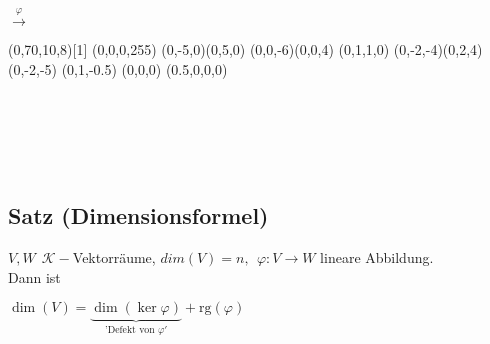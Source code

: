 \documentclass[a4paper, 12pt,titlepage, pdf, headsepline]{scrartcl}
\newcommand{\R}{\mathds{R}}
\newcommand{\K}{\mathcal{K}}
\newcommand{\rg}{\textrm{rg}}
\renewcommand{\>}{\rightarrow}
\renewcommand{\*}{\cdot}
\renewcommand{\phi}{\varphi}
\begin{document}
		      			\begin{minipage}[c]{0.15\textwidth}~\\
		      				~\\
		      				~\\
		      				~\\
		      				~\\
		      				~\\
		      				\centering	$\overset{\phi}{\longrightarrow}$
		      			\end{minipage}
		      			\begin{minipage}[c]{0.425\textwidth}
		      				\Viewpoint(0,70,10,8)[1]
		      				\SetCMYKColor(0,0,0,255)
		      				\SetNormal
		      				\DDArrowAt(0,-5,0)(0,5,0)
		      				\DDArrowAt(0,0,-6)(0,0,4)
		      				\Text[r]{$y~~~~~~~~~~~~~~~~~~~~~\R^2$}
		      				\SetCMYKColor(0,1,1,0)
		      				\DDArrowAt(0,-2,-4)(0,2,4)
		      				\Text[b]{$\phi(\R^3)$}
		      				\DDMoveTo(0,-2,-5)
		      				\Text[c]{$\phi(\langle v\rangle)$}
		      				\DDMoveTo(0,1,-0.5)
		      				\Text[c]{$\ker\phi$}
		      				\DDMoveTo(0,0,0)
		      				\SetCMYKColor(0.5,0,0,0)
		      				\BigPoint
		      				\CloseGraph
		      			\end{minipage}\\
		      			\\
		      			\\
		      			\\
		      			\subsection{Satz (Dimensionsformel)}
		      			\label{6.14}
		      			$V,W ~~\K-$Vektorräume, $dim(V) = n,~~ \phi: V \rightarrow W$ lineare Abbildung.\\
		      			Dann ist 
		      			\begin{center}
		      				$\dim(V)= \underbrace{\dim(\ker\phi)}_{\text{'Defekt von }\phi'} + \rg(\phi)$
		      			\end{center}
\end{document}

